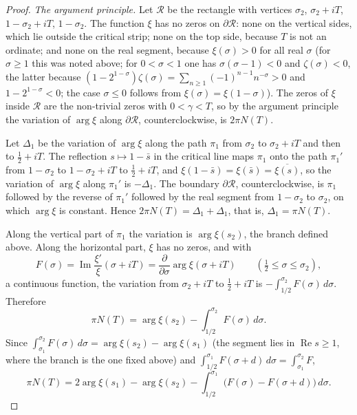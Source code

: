 \documentclass[11pt,reqno]{amsart}
\numberwithin{equation}{section}
\theoremstyle{definition}
\theoremstyle{remark}
\newcommand{\Rp}{\operatorname{Re}}
\newcommand{\Ip}{\operatorname{Im}}
\begin{document}
\begin{proof}
\emph{The argument principle.} Let $\mathcal R$ be the rectangle with vertices $\sigma_2$, $\sigma_2+iT$, $1-\sigma_2+iT$, $1-\sigma_2$. The function $\xi$ has no zeros on $\partial\mathcal R$: none on the vertical sides, which lie outside the critical strip; none on the top side, because $T$ is not an ordinate; and none on the real segment, because $\xi(\sigma)>0$ for all real $\sigma$ (for $\sigma\ge1$ this was noted above; for $0<\sigma<1$ one has $\sigma(\sigma-1)<0$ and $\zeta(\sigma)<0$, the latter because $(1-2^{1-\sigma})\zeta(\sigma)=\sum_{n\ge1}(-1)^{n-1}n^{-\sigma}>0$ and $1-2^{1-\sigma}<0$; the case $\sigma\le0$ follows from $\xi(\sigma)=\xi(1-\sigma)$). The zeros of $\xi$ inside $\mathcal R$ are the non-trivial zeros with $0<\gamma<T$, so by the argument principle the variation of $\arg\xi$ along $\partial\mathcal R$, counterclockwise, is $2\pi N(T)$.

Let $\Delta_1$ be the variation of $\arg\xi$ along the path $\pi_1$ from $\sigma_2$ to $\sigma_2+iT$ and then to $\frac12+iT$. The reflection $s\mapsto1-\bar s$ in the critical line maps $\pi_1$ onto the path $\pi_1'$ from $1-\sigma_2$ to $1-\sigma_2+iT$ to $\frac12+iT$, and $\xi(1-\bar s)=\xi(\bar s)=\overline{\xi(s)}$, so the variation of $\arg\xi$ along $\pi_1'$ is $-\Delta_1$. The boundary $\partial\mathcal R$, counterclockwise, is $\pi_1$ followed by the reverse of $\pi_1'$ followed by the real segment from $1-\sigma_2$ to $\sigma_2$, on which $\arg\xi$ is constant. Hence $2\pi N(T)=\Delta_1+\Delta_1$, that is, $\Delta_1=\pi N(T)$.

Along the vertical part of $\pi_1$ the variation is $\arg\xi(s_2)$, the branch defined above. Along the horizontal part, $\xi$ has no zeros, and with
\begin{equation}
F(\sigma)=\Ip\frac{\xi'}\xi(\sigma+iT)=\frac{\partial}{\partial\sigma}\arg\xi(\sigma+iT)\qquad(\tfrac12\le\sigma\le\sigma_2),
\label{eq:F_def}
\end{equation}
a continuous function, the variation from $\sigma_2+iT$ to $\frac12+iT$ is $-\int_{1/2}^{\sigma_2}F(\sigma)\,d\sigma$. Therefore
\begin{equation}
\pi N(T)=\arg\xi(s_2)-\int_{1/2}^{\sigma_2}F(\sigma)\,d\sigma .
\label{eq:argprinciple}
\end{equation}
Since $\int_{\sigma_1}^{\sigma_2}F(\sigma)\,d\sigma=\arg\xi(s_2)-\arg\xi(s_1)$ (the segment lies in $\Rp s\ge1$, where the branch is the one fixed above) and $\int_{1/2}^{\sigma_1}F(\sigma+d)\,d\sigma=\int_{\sigma_1}^{\sigma_2}F$,
\begin{equation}
\pi N(T)=2\arg\xi(s_1)-\arg\xi(s_2)-\int_{1/2}^{\sigma_1}\bigl(F(\sigma)-F(\sigma+d)\bigr)\,d\sigma .
\label{eq:turing_split}
\end{equation}


\end{proof}
\end{document}
